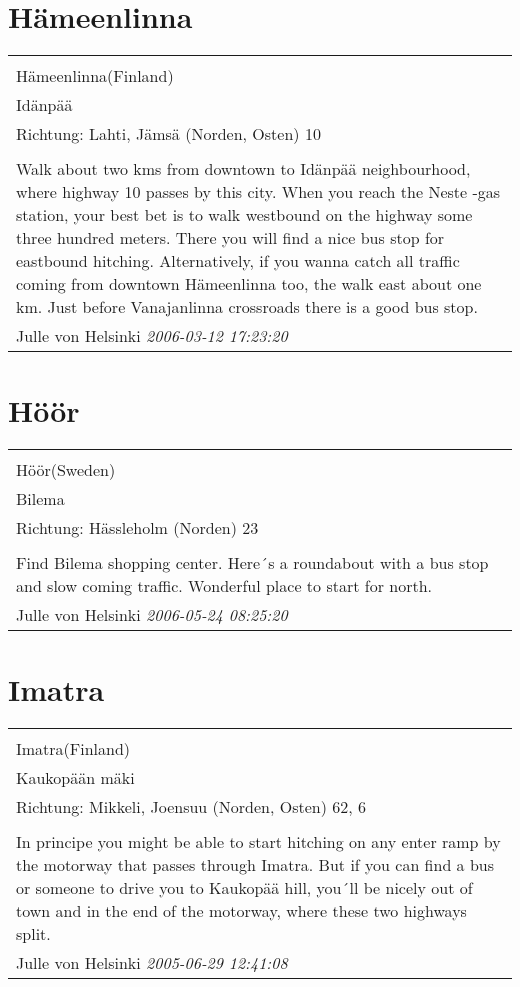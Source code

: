 \documentclass[a4paper,12pt]{article}
\begin{document}
\section{Hämeenlinna}
\begin{tabular}{|p{13cm}|}
\hline\\
Hämeenlinna(Finland)\\
Idänpää\\
Richtung: Lahti, Jämsä (Norden, Osten) 10 \\
\hline\\
Walk about two kms from downtown to Idänpää neighbourhood, where highway 10 passes by this city. When you reach the Neste -gas station, your best bet is to walk westbound on the highway some three hundred meters. There you will find a nice bus stop for eastbound hitching. Alternatively, if you wanna catch all traffic coming from downtown Hämeenlinna too, the walk east about one km. Just before Vanajanlinna crossroads there is a good bus stop. \\
Julle von Helsinki \textit{ 2006-03-12 17:23:20 }\\\hline
\end{tabular}


\section{Höör}
\begin{tabular}{|p{13cm}|}
\hline\\
Höör(Sweden)\\
Bilema\\
Richtung: Hässleholm (Norden) 23 \\
\hline\\
Find Bilema shopping center. Here´s a roundabout with a bus stop and slow coming traffic. Wonderful place to start for north. \\
Julle von Helsinki \textit{ 2006-05-24 08:25:20 }\\\hline
\end{tabular}


\section{Imatra}
\begin{tabular}{|p{13cm}|}
\hline\\
Imatra(Finland)\\
Kaukopään mäki\\
Richtung: Mikkeli, Joensuu (Norden, Osten) 62, 6 \\
\hline\\
In principe you might be able to start hitching on any enter ramp by the motorway that passes through Imatra. But if you can find a bus or someone to drive you to Kaukopää hill, you´ll be nicely out of town and in the end of the motorway, where these two highways split. \\
Julle von Helsinki \textit{ 2005-06-29 12:41:08 }\\\hline
\end{tabular}
\end{document}
